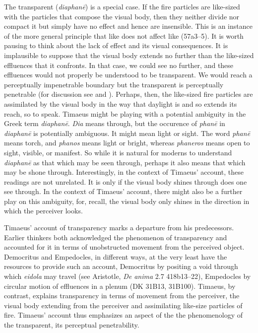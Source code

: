 The transparent (\emph{diaphanē}) is a special case. If the fire particles are like-sized with the particles that compose the visual body, then they neither divide nor compact it but simply have no effect and hence are insensible. This is an instance of the more general principle that like does not affect like (57a3--5). It is worth pausing to think about the lack of effect and its visual consequences. It is implausible to suppose that the visual body extends no further than the like-sized effluences that it confronts. In that case, we could see no further, and these effluences would not properly be understood to be transparent. We would reach a perceptually impenetrable boundary but the transparent is perceptually penetrable (for discussion see \citealt{Crowther:2018yt} and \citealt{Kalderon:2018wn}). Perhaps, then, the like-sized fire particles are assimilated by the visual body in the way that daylight is and so extends its reach, so to speak. Timaeus might be playing with a potential ambiguity in the Greek term \emph{diaphanē}. \emph{Dia} means through, but the occurence of \emph{phanē} in \emph{diaphanē} is potentially ambiguous. It might mean light or sight. The word \emph{phanē} means torch, and \emph{phanos} means light or bright, whereas \emph{phaneros} means open to sight, visible, or manifest. So while it is natural for moderns to understand \emph{diaphanē} as that which may be seen through, perhaps it also means that which may be shone through. Interestingly, in the context of Timaeus' account, these readings are not unrelated. It is only if the visual body shines through does one see through. In the context of Timaeus' account, there might also be a further play on this ambiguity, for, recall, the visual body only shines in the direction in which the perceiver looks.

Timaeus' account of transparency marks a departure from his predecessors. Earlier thinkers both acknowledged the phenomenon of transparency and accounted for it in terms of unobstructed movement from the perceived object. Democritus and Empedocles, in different ways, at the very least have the resources to provide such an account, Democritus by positing a void through which \emph{eidola} may travel (see Aristotle, \emph{De anima} 2.7 418b13–22), Empedocles by circular motion of effluences in a plenum (DK 31B13, 31B100). Timaeus, by contrast, explains transparency in terms of movement from the perceiver, the visual body extending from the perceiver and assimilating like-size particles of fire. Timaeus' account thus emphasizes an aspect of the the phenomenology of the transparent, its perceptual penetrability. 

